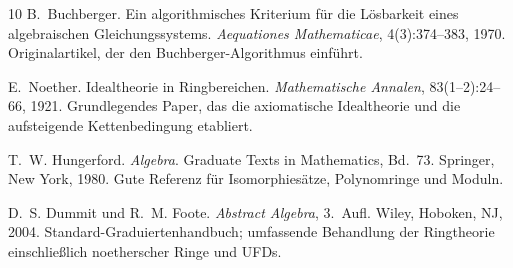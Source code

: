 \documentclass[12pt,a4paper]{amsart}
\theoremstyle{definition}
\theoremstyle{definition}
\begin{document}
\begin{thebibliography}{10}
B.~Buchberger.
\newblock Ein algorithmisches Kriterium für die Lösbarkeit eines algebraischen
Gleichungssystems.
\newblock \textit{Aequationes Mathematicae}, 4(3):374--383, 1970.
\newblock Originalartikel, der den Buchberger-Algorithmus einführt.

E.~Noether.
\newblock Idealtheorie in Ringbereichen.
\newblock \textit{Mathematische Annalen}, 83(1--2):24--66, 1921.
\newblock Grundlegendes Paper, das die axiomatische Idealtheorie und die aufsteigende
Kettenbedingung etabliert.

T.~W. Hungerford.
\newblock \textit{Algebra}.
\newblock Graduate Texts in Mathematics, Bd.~73.
\newblock Springer, New York, 1980.
\newblock Gute Referenz für Isomorphiesätze, Polynomringe und Moduln.

D.~S. Dummit und R.~M. Foote.
\newblock \textit{Abstract Algebra}, 3.~Aufl.
\newblock Wiley, Hoboken, NJ, 2004.
\newblock Standard-Graduiertenhandbuch; umfassende Behandlung der Ringtheorie
einschließlich noetherscher Ringe und UFDs.

\end{thebibliography}
\end{document}
